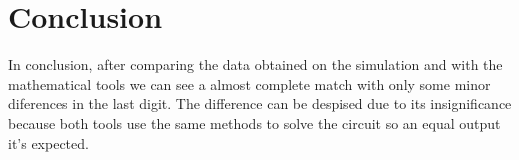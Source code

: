 \section{Conclusion}
\label{sec:conclusion}

In conclusion, after comparing the data obtained on the simulation and with the mathematical tools we can see a almost complete match with only some minor diferences in the last digit. The difference can be despised due to its insignificance because both tools use the same methods to solve the circuit so an equal output it’s expected.


